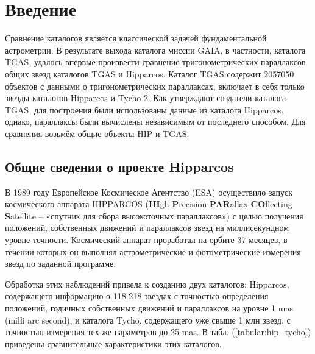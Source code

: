 \documentclass[14pt]{article} %
\begin{document}
 
\section{Введение}\label{introduction}


Сравнение каталогов является классической задачей фундаментальной астрометрии. В результате выхода каталога миссии GAIA, в частности, каталога TGAS, удалось впервые произвести сравнение тригонометрических параллаксов общих звезд каталогов TGAS и  Hipparcos. Каталог TGAS содержит 2057050 объектов с данными о тригонометрических параллаксах, включает в себя только звезды каталогов Hipparcos и Tycho-2. Как утверждают создатели каталога TGAS, для построения были использованы данные из каталога Hipparcos, однако, параллаксы были вычислены независимым от последнего способом. Для сравнения возьмём общие объекты HIP и TGAS.

\subsection{Общие сведения о проекте Hipparcos}\label{sub:smthhip}

В 1989 году Европейское Космическое Агентство (ESA) осуществило запуск космического аппарата HIPPARCOS (\textbf{HI}gh \textbf{P}recision \textbf{PAR}allax \textbf{CO}llecting \textbf{S}atellite – «спутник для сбора высокоточных параллаксов») с целью получения положений, собственных движений и параллаксов звезд на миллисекундном уровне точности. Космический аппарат проработал на орбите 37 месяцев, в течении которых он выполнял астрометрические и фотометрические измерения звезд по заданной программе.

Обработка этих наблюдений привела к созданию двух каталогов: Hipparcos, содержащего информацию о 118 218 звездах с точностью определения положений, годичных собственных движений и параллаксов на уровне 1 mas (milli arc second), и
каталога Tycho, содержащего уже свыше 1 млн звезд, с точностью измерения тех же параметров до 25 mas. В табл. (\ref{tabular:hip_tycho}) приведены сравнительные характеристики этих каталогов.
\end{document}
